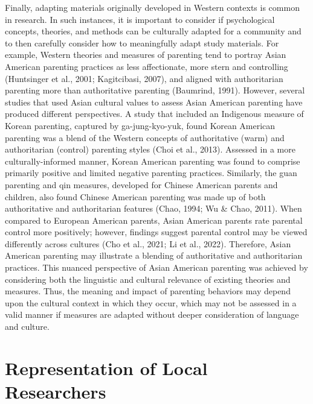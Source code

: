 \documentclass[
  11pt,
]{book}
\begin{document}
Finally, adapting materials originally developed in Western contexts is common in research. In such instances, it is important to consider if psychological concepts, theories, and methods can be culturally adapted for a community and to then carefully consider how to meaningfully adapt study materials. For example, Western theories and measures of parenting tend to portray Asian American parenting practices as less affectionate, more stern and controlling (Huntsinger et al., 2001; Kagitcibasi, 2007), and aligned with authoritarian parenting more than authoritative parenting (Baumrind, 1991). However, several studies that used Asian cultural values to assess Asian American parenting have produced different perspectives. A study that included an Indigenous measure of Korean parenting, captured by ga-jung-kyo-yuk, found Korean American parenting was a blend of the Western concepts of authoritative (warm) and authoritarian (control) parenting styles (Choi et al., 2013). Assessed in a more culturally-informed manner, Korean American parenting was found to comprise primarily positive and limited negative parenting practices. Similarly, the guan parenting and qin measures, developed for Chinese American parents and children, also found Chinese American parenting was made up of both authoritative and authoritarian features (Chao, 1994; Wu \& Chao, 2011). When compared to European American parents, Asian American parents rate parental control more positively; however, findings suggest parental control may be viewed differently across cultures (Cho et al., 2021; Li et al., 2022). Therefore, Asian American parenting may illustrate a blending of authoritative and authoritarian practices. This nuanced perspective of Asian American parenting was achieved by considering both the linguistic and cultural relevance of existing theories and measures. Thus, the meaning and impact of parenting behaviors may depend upon the cultural context in which they occur, which may not be assessed in a valid manner if measures are adapted without deeper consideration of language and culture.

\section{Representation of Local Researchers}\label{representation-of-local-researchers}
\end{document}
